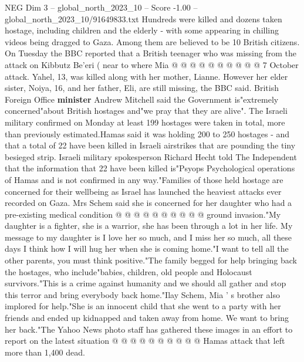 \begin{textsample}{NEG Dim 3 – global\_north\_2023\_10 – Score -1.00 – global\_north\_2023\_10/91649833.txt}
Hundreds were killed and dozens taken hostage, including children and the elderly - with some appearing in chilling videos being dragged to Gaza.
Among them are believed to be 10 British citizens.
On Tuesday the BBC reported that a British teenager who was missing from the attack on Kibbutz Be'eri ( near to where Mia @ @ @ @ @ @ @ @ @ @ 7 October attack.
Yahel, 13, was killed along with her mother, Lianne.
However her elder sister, Noiya, 16, and her father, Eli, are still missing, the BBC said.
British Foreign Office \textbf{minister} Andrew Mitchell said the Government is"extremely concerned"about British hostages and"we pray that they are alive".
The Israeli military confirmed on Monday at least 199 hostages were taken in total, more than previously estimated.Hamas said it was holding 200 to 250 hostages - and that a total of 22 have been killed in Israeli airstrikes that are pounding the tiny besieged strip.
Israeli military spokesperson Richard Hecht told The Independent that the information that 22 have been killed is"Psyops Psychological operations of Hamas and is not confirmed in any way."Families of those held hostage are concerned for their wellbeing as Israel has launched the heaviest attacks ever recorded on Gaza.
Mrs Schem said she is concerned for her daughter who had a pre-existing medical condition @ @ @ @ @ @ @ @ @ @ ground invasion."My daughter is a fighter, she is a warrior, she has been through a lot in her life.
My message to my daughter is I love her so much, and I miss her so much, all these days I think how I will hug her when she is coming home."I want to tell all the other parents, you must think positive."The family begged for help bringing back the hostages, who include"babies, children, old people and Holocaust survivors."This is a crime against humanity and we should all gather and stop this terror and bring everybody back home."Ilay Schem, Mia ' s brother also implored for help."She is an innocent child that she went to a party with her friends and ended up kidnapped and taken away from home.
We want to bring her back."The Yahoo News photo staff has gathered these images in an effort to report on the latest situation @ @ @ @ @ @ @ @ @ @ Hamas attack that left more than 1,400 dead.

\end{textsample}
